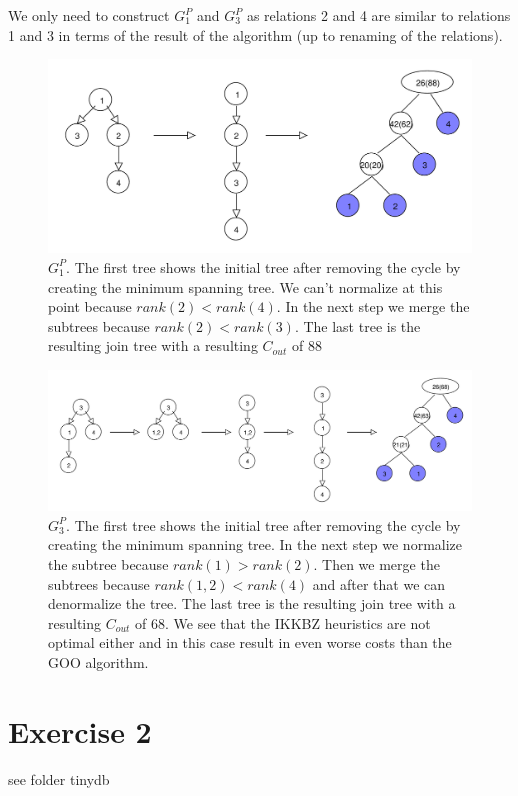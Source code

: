 \documentclass[11pt,a4paper]{scrartcl}
\begin{document}
We only need to construct $G^P_1$ and $G^P_3$ as relations 2 and 4 are similar to relations 1 and 3 in terms of the result of the algorithm (up to renaming of the relations).

\begin{figure}[H]
	\begin{center}
		\includegraphics[width=\textwidth]{graphs/gp1}
	\end{center}
	\caption{$G^P_1$. The first tree shows the initial tree after removing the cycle by creating the minimum spanning tree. We can't normalize at this point because $rank(2)<rank(4)$. In the next step we merge the subtrees because $rank(2)<rank(3)$. The last tree is the resulting join tree with a resulting $C_{out}$ of 88}
	\label{fig:gp1}
\end{figure}


\begin{figure}[H]
	\begin{center}
		\includegraphics[width=\textwidth]{graphs/gp3}
	\end{center}
	\caption{$G^P_3$. The first tree shows the initial tree after removing the cycle by creating the minimum spanning tree. In the next step we normalize the subtree because $rank(1)>rank(2)$. Then we merge the subtrees because $rank(1,2)<rank(4)$ and after that we can denormalize the tree. The last tree is the resulting join tree with a resulting $C_{out}$ of 68. We see that the IKKBZ heuristics are not optimal either and in this case result in even worse costs than the GOO algorithm.}
	\label{fig:gp3}
\end{figure}


\section*{Exercise 2}

see folder tinydb
\end{document}
